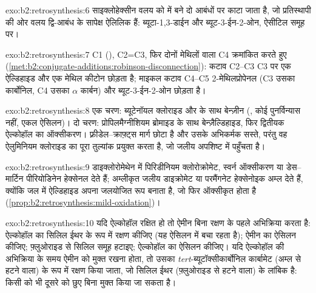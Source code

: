 \begin{solution}{exo:b2:retrosynthesis:6}
साइक्लोहेक्सीन वलय को  में बने दो  आबंधों पर काटा जाता है, जो
प्रतिस्थापी की ओर वलय द्वि-आबंध के सापेक्ष ऐलिलिक हैं: ब्यूटा-1,3-डाईन और ब्यूट-3-ईन-2-ओन,
ऐसीटिल समूह  पर।
\end{solution}

\begin{solution}{exo:b2:retrosynthesis:7}
C1 (), C2=C3, फिर दोनों मेथिलों वाला C4 क्रमांकित करते हुए
(\cref{met:b2:conjugate-additions:robinson-disconnection}):  कटाव C2--C3 C3 पर एक ऐल्डिहाइड
और एक मेथिल कीटोन छोड़ता है; माइकल कटाव C4--C5 2-मेथिलप्रोपेनल (C3 उसका कार्बोनिल, C4 उसका
$\alpha$ कार्बन) और ब्यूट-3-ईन-2-ओन छोड़ता है।
\end{solution}

\begin{solution}{exo:b2:retrosynthesis:8}
एक चरण: ब्यूटेनॉयल क्लोराइड और  के साथ बेन्ज़ीन (, कोई पुनर्विन्यास नहीं,
एकल ऐसिलन)। दो चरण: प्रोपिलमैग्नीशियम ब्रोमाइड के साथ बेन्ज़ैल्डिहाइड, फिर द्वितीयक
ऐल्कोहॉल का ऑक्सीकरण। फ़्रीडेल--क्राफ़्ट्स मार्ग छोटा है और उसके अभिकर्मक सस्ते, परंतु वह ऐलुमिनियम क्लोराइड का
पूरा तुल्यांक प्रयुक्त करता है, जो जलीय अपशिष्ट में पहुँचता है।
\end{solution}

\begin{solution}{exo:b2:retrosynthesis:9}
डाइक्लोरोमेथेन में पिरिडीनियम क्लोरोक्रोमेट, स्वर्न ऑक्सीकरण या डेस--मार्टिन पीरियोडिनेन
हेक्सेनल देते हैं; अम्लीकृत जलीय डाइक्रोमेट या परमैंगनेट हेक्सेनोइक अम्ल देते हैं, क्योंकि जल में
ऐल्डिहाइड अपना जलयोजित रूप बनाता है, जो फिर ऑक्सीकृत होता है (\cref{prop:b2:retrosynthesis:mild-oxidation})।
\end{solution}

\begin{solution}{exo:b2:retrosynthesis:10}
यदि ऐल्कोहॉल रक्षित हो तो ऐमीन बिना रक्षण के पहले अभिक्रिया करता है: ऐल्कोहॉल का सिलिल ईथर के रूप में रक्षण कीजिए
(यह ऐसिलन में बचा रहता है); ऐमीन का ऐसिलन कीजिए; फ़्लुओराइड से सिलिल समूह हटाइए; ऐल्कोहॉल का
ऐसिलन कीजिए। यदि ऐल्कोहॉल की अभिक्रिया के समय ऐमीन को मुक्त रखना होता, तो उसका
\textit{tert}-ब्यूटॉक्सीकार्बोनिल कार्बामेट (अम्ल से हटने वाला) के रूप में रक्षण किया जाता, जो सिलिल ईथर (फ़्लुओराइड से
हटने वाला) के लांबिक है: किसी को भी दूसरे को छुए बिना मुक्त किया जा सकता है।
\end{solution}

